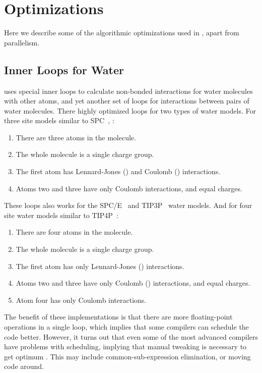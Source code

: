 

\section{Optimizations}
Here we describe some of the algorithmic optimizations used 
in {\gromacs}, apart from parallelism. 

\subsection{Inner Loops for Water}
\label{sec:waterloops}
{\gromacs} uses special inner loops to calculate non-bonded
interactions for water molecules with other atoms, and yet
another set of loops for interactions between pairs of
water molecules. There highly optimized loops for two types of water models.
For three site models similar to
SPC~\cite{Berendsen81}, {\ie}:
\begin{enumerate}
\item   There are three atoms in the molecule.
\item   The whole molecule is a single charge group.
\item   The first atom has Lennard-Jones () and 
        Coulomb () interactions.
\item   Atoms two and three have only Coulomb interactions, 
        and equal charges.
\end{enumerate}
These loops also works for the SPC/E~\cite{Berendsen87} and 
TIP3P~\cite{Jorgensen83} water models.
And for four site water models similar to TIP4P~\cite{Jorgensen83}:
\begin{enumerate}
\item   There are four atoms in the molecule.
\item   The whole molecule is a single charge group.
\item   The first atom has only Lennard-Jones () interactions.
\item   Atoms two and three have only Coulomb () interactions, 
        and equal charges.
\item   Atom four has only Coulomb interactions.
\end{enumerate}

The benefit of these implementations is that there are more floating-point
operations in a single loop, which implies that some compilers
can schedule the code better. However, it turns out that even
some of the most advanced compilers have problems with scheduling, 
implying that manual tweaking is necessary to get optimum 
.
This may include common-sub-expression elimination, or moving
code around. 

